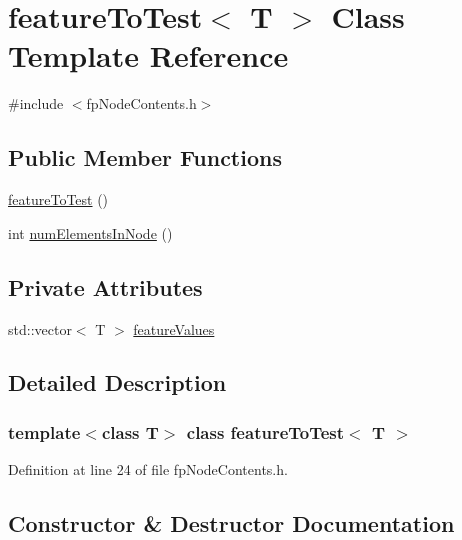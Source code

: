 \hypertarget{classfeatureToTest}{}\section{feature\+To\+Test$<$ T $>$ Class Template Reference}
\label{classfeatureToTest}


{\ttfamily \#include $<$fp\+Node\+Contents.\+h$>$}

\subsection*{Public Member Functions}
\begin{DoxyCompactItemize}
\item 
\hyperlink{classfeatureToTest_a81dfa1a43d5d32a549170ca8cf04b108}{feature\+To\+Test} ()
\item 
int \hyperlink{classfeatureToTest_a5d5dd0a1ce8df9e0532616a30e6506dc}{num\+Elements\+In\+Node} ()
\end{DoxyCompactItemize}
\subsection*{Private Attributes}
\begin{DoxyCompactItemize}
\item 
std\+::vector$<$ T $>$ \hyperlink{classfeatureToTest_a59fefb4d5b41187ab0d2b7de0f48076d}{feature\+Values}
\end{DoxyCompactItemize}


\subsection{Detailed Description}
\subsubsection*{template$<$class T$>$\newline
class feature\+To\+Test$<$ T $>$}



Definition at line 24 of file fp\+Node\+Contents.\+h.



\subsection{Constructor \& Destructor Documentation}
\mbox{\label{classfeatureToTest_a81dfa1a43d5d32a549170ca8cf04b108}} 

